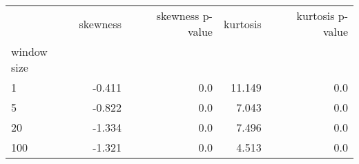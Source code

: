 \begin{tabular}{lrrrr}
\toprule
{} &  skewness &  skewness p-value &  kurtosis &  kurtosis p-value \\
window size &           &                   &           &                   \\
\midrule
1           &    -0.411 &               0.0 &    11.149 &               0.0 \\
5           &    -0.822 &               0.0 &     7.043 &               0.0 \\
20          &    -1.334 &               0.0 &     7.496 &               0.0 \\
100         &    -1.321 &               0.0 &     4.513 &               0.0 \\
\bottomrule
\end{tabular}
